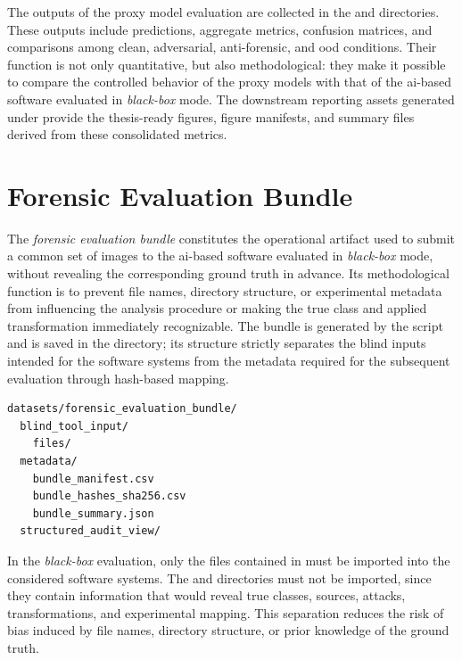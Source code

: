 The outputs of the proxy model evaluation are collected in the
 and 
directories. These outputs include predictions, aggregate metrics, confusion
matrices, and comparisons among clean, adversarial, anti-forensic, and
\gls{ood} conditions. Their function is not only quantitative, but also
methodological: they make it possible to compare the controlled behavior of the
proxy models with that of the \gls{ai}-based software evaluated in
\textit{black-box} mode. The downstream reporting assets generated under
 provide the thesis-ready figures,
figure manifests, and summary files derived from these consolidated metrics.


\section{Forensic Evaluation Bundle}
\label{app:forensic-evaluation-bundle}

The \textit{forensic evaluation bundle} constitutes the operational artifact
used to submit a common set of images to the \gls{ai}-based software evaluated
in \textit{black-box} mode, without revealing the corresponding ground truth in
advance. Its methodological function is to prevent file names, directory
structure, or experimental metadata from influencing the analysis procedure or
making the true class and applied transformation immediately recognizable. The
bundle is generated by the script
 and is
saved in the  directory; its
structure strictly separates the blind inputs intended for the software systems
from the metadata required for the subsequent evaluation through hash-based
mapping.

\begin{lstlisting}[caption={Logical structure of the forensic evaluation bundle.}, label={lst:forensic-evaluation-bundle-structure}]
datasets/forensic_evaluation_bundle/
  blind_tool_input/
    files/
  metadata/
    bundle_manifest.csv
    bundle_hashes_sha256.csv
    bundle_summary.json
  structured_audit_view/
\end{lstlisting}

In the \textit{black-box} evaluation, only the files contained in
 must be imported into the considered
software systems. The  and
 directories must not be imported, since they
contain information that would reveal true classes, sources, attacks,
transformations, and experimental mapping. This separation reduces the risk of
bias induced by file names, directory structure, or prior knowledge of the
ground truth.

